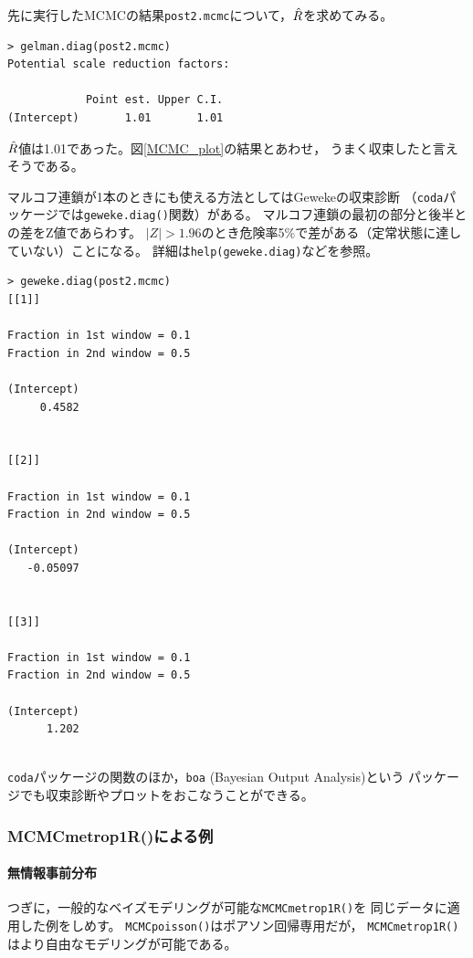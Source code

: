 \documentclass[11pt,uplatex]{jsarticle}
\begin{document}
先に実行したMCMCの結果\texttt{post2.mcmc}について，$\Hat{R}$を求めてみる。
\begin{lstlisting}
> gelman.diag(post2.mcmc)
Potential scale reduction factors:

            Point est. Upper C.I.
(Intercept)       1.01       1.01

\end{lstlisting}
$\Hat{R}$値は1.01であった。図\ref{MCMC_plot}の結果とあわせ，
うまく収束したと言えそうである。

\vspace{1zw}

マルコフ連鎖が1本のときにも使える方法としてはGewekeの収束診断
（\texttt{coda}パッケージでは\texttt{geweke.diag()}関数）がある。
マルコフ連鎖の最初の部分と後半との差をZ値であらわす。
$|Z|>1.96$のとき危険率5\%で差がある（定常状態に達していない）ことになる。
詳細は\texttt{help(geweke.diag)}などを参照。
\begin{lstlisting}
> geweke.diag(post2.mcmc)
[[1]]

Fraction in 1st window = 0.1
Fraction in 2nd window = 0.5 

(Intercept) 
     0.4582 


[[2]]

Fraction in 1st window = 0.1
Fraction in 2nd window = 0.5 

(Intercept) 
   -0.05097 


[[3]]

Fraction in 1st window = 0.1
Fraction in 2nd window = 0.5 

(Intercept) 
      1.202 


\end{lstlisting}

\texttt{coda}パッケージの関数のほか，\texttt{boa} (Bayesian Output Analysis)という
パッケージでも収束診断やプロットをおこなうことができる。

\subsubsection{MCMCmetrop1R()による例}

\paragraph{無情報事前分布}
つぎに，一般的なベイズモデリングが可能な\texttt{MCMCmetrop1R()}を
同じデータに適用した例をしめす。
\texttt{MCMCpoisson()}はポアソン回帰専用だが，
\texttt{MCMCmetrop1R()}はより自由なモデリングが可能である。
\end{document}
